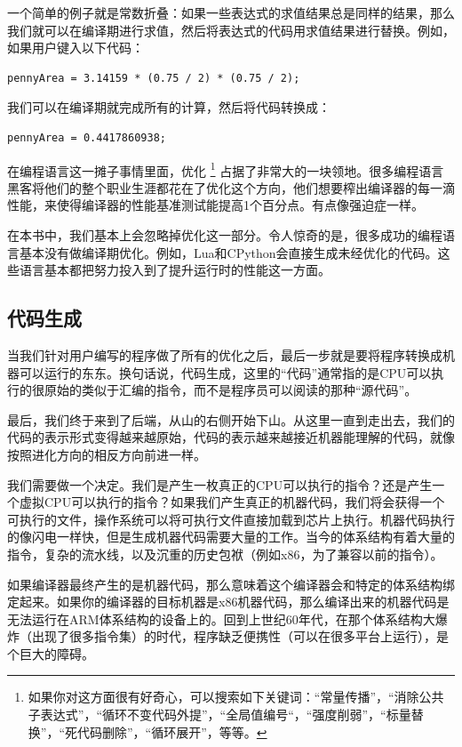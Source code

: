 \documentclass[cn,10pt,math=newtx,citestyle=gb7714-2015,bibstyle=gb7714-2015]{elegantbook}
\begin{document}
一个简单的例子就是常数折叠：如果一些表达式的求值结果总是同样的结果，那么我们就可以在编译期进行求值，然后将表达式的代码用求值结果进行替换。例如，如果用户键入以下代码：

\begin{verbatim}
pennyArea = 3.14159 * (0.75 / 2) * (0.75 / 2);
\end{verbatim}

我们可以在编译期就完成所有的计算，然后将代码转换成：

\begin{verbatim}
pennyArea = 0.4417860938;
\end{verbatim}

在编程语言这一摊子事情里面，优化 \footnote{如果你对这方面很有好奇心，可以搜索如下关键词：“常量传播”，“消除公共子表达式”，“循环不变代码外提”，“全局值编号“，“强度削弱”，“标量替换”，“死代码删除”，“循环展开”，等等。} 占据了非常大的一块领地。很多编程语言黑客将他们的整个职业生涯都花在了优化这个方向，他们想要榨出编译器的每一滴性能，来使得编译器的性能基准测试能提高1个百分点。有点像强迫症一样。

在本书中，我们基本上会忽略掉优化这一部分。令人惊奇的是，很多成功的编程语言基本没有做编译期优化。例如，Lua和CPython会直接生成未经优化的代码。这些语言基本都把努力投入到了提升运行时的性能这一方面。

\subsection{代码生成}

当我们针对用户编写的程序做了所有的优化之后，最后一步就是要将程序转换成机器可以运行的东东。换句话说，代码生成，这里的“代码”通常指的是CPU可以执行的很原始的类似于汇编的指令，而不是程序员可以阅读的那种“源代码”。

最后，我们终于来到了后端，从山的右侧开始下山。从这里一直到走出去，我们的代码的表示形式变得越来越原始，代码的表示越来越接近机器能理解的代码，就像按照进化方向的相反方向前进一样。

我们需要做一个决定。我们是产生一枚真正的CPU可以执行的指令？还是产生一个虚拟CPU可以执行的指令？如果我们产生真正的机器代码，我们将会获得一个可执行的文件，操作系统可以将可执行文件直接加载到芯片上执行。机器代码执行的像闪电一样快，但是生成机器代码需要大量的工作。当今的体系结构有着大量的指令，复杂的流水线，以及沉重的历史包袱（例如x86，为了兼容以前的指令）。

如果编译器最终产生的是机器代码，那么意味着这个编译器会和特定的体系结构绑定起来。如果你的编译器的目标机器是x86机器代码，那么编译出来的机器代码是无法运行在ARM体系结构的设备上的。回到上世纪60年代，在那个体系结构大爆炸（出现了很多指令集）的时代，程序缺乏便携性（可以在很多平台上运行），是个巨大的障碍。
\end{document}
